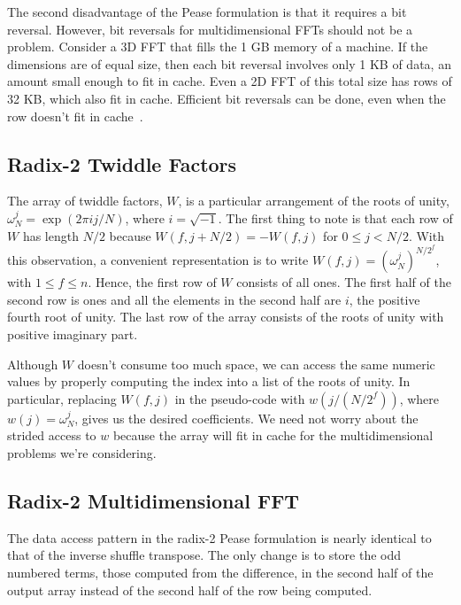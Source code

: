 \documentclass{article}
\begin{document}
The second disadvantage of the Pease formulation is that it requires a
bit reversal.  However, bit reversals for multidimensional FFTs should
not be a problem.  Consider a 3D FFT that fills the 1 GB memory of a
machine.  If the dimensions are of equal size, then each bit reversal
involves only 1 KB of data, an amount small enough to fit in cache.
Even a 2D FFT of this total size has rows of 32 KB, which also fit in
cache.  Efficient bit reversals can be done, even when the row doesn't
fit in cache~\cite{bitrev}.

\subsection{Radix-2 Twiddle Factors} \label{sec:twiddle2}

The array of twiddle factors, $W$, is a particular arrangement of the
roots of unity, $\omega_N^j = \exp(2 \pi i j/N)$, where $i =
\sqrt{-1}$.  The first thing to note is that each row of $W$ has
length $N/2$ because $W(f,j+N/2) = - W(f,j)$ for $0 \le j < N/2$.
With this observation, a convenient representation is to write $W(f,j)
= (\omega_N^j)^{N/2^f}$, with $1 \le f \le n$.  Hence, the first row
of $W$ consists of all ones.  The first half of the second row is ones
and all the elements in the second half are $i$, the positive fourth
root of unity.  The last row of the array consists of the roots of
unity with positive imaginary part.

Although $W$ doesn't consume too much space, we can access the same
numeric values by properly computing the index into a list of the
roots of unity.  In particular, replacing $W(f,j)$ in the pseudo-code
with $w(j/(N/2^f))$, where $w(j) = \omega_N^j$, gives us the desired
coefficients.  We need not worry about the strided access to $w$
because the array will fit in cache for the multidimensional problems
we're considering.

\subsection{Radix-2 Multidimensional FFT} \label{sec:mdfft2}

The data access pattern in the radix-2 Pease formulation is nearly
identical to that of the inverse shuffle transpose.  The only change
is to store the odd numbered terms, those computed from the
difference, in the second half of the output array instead of the
second half of the row being computed.
\end{document}
